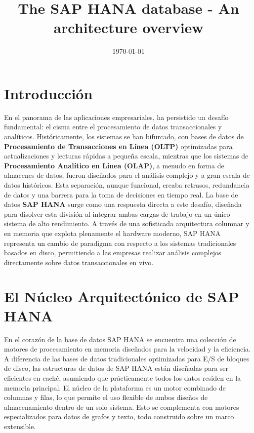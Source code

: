 \documentclass[12pt,a4paper]{article}
\title{The SAP HANA database - An architecture overview}
\date{\today}
\begin{document}
\maketitle

\section*{Introducción}

En el panorama de las aplicaciones empresariales, ha persistido un desafío fundamental: el cisma entre el procesamiento de datos transaccionales y analíticos. Históricamente, los sistemas se han bifurcado, con bases de datos de \textbf{Procesamiento de Transacciones en Línea (OLTP)} optimizadas para actualizaciones y lecturas rápidas a pequeña escala, mientras que los sistemas de \textbf{Procesamiento Analítico en Línea (OLAP)}, a menudo en forma de almacenes de datos, fueron diseñados para el análisis complejo y a gran escala de datos históricos. Esta separación, aunque funcional, creaba retrasos, redundancia de datos y una barrera para la toma de decisiones en tiempo real. La base de datos \textbf{SAP HANA} surge como una respuesta directa a este desafío, diseñada para disolver esta división al integrar ambas cargas de trabajo en un único sistema de alto rendimiento. A través de una sofisticada arquitectura columnar y en memoria que explota plenamente el hardware moderno, SAP HANA representa un cambio de paradigma con respecto a los sistemas tradicionales basados en disco, permitiendo a las empresas realizar análisis complejos directamente sobre datos transaccionales en vivo.

\section*{El Núcleo Arquitectónico de SAP HANA}

En el corazón de la base de datos SAP HANA se encuentra una colección de motores de procesamiento en memoria diseñados para la velocidad y la eficiencia. A diferencia de las bases de datos tradicionales optimizadas para E/S de bloques de disco, las estructuras de datos de SAP HANA están diseñadas para ser eficientes en caché, asumiendo que prácticamente todos los datos residen en la memoria principal. El núcleo de la plataforma es un motor combinado de columnas y filas, lo que permite el uso flexible de ambos diseños de almacenamiento dentro de un solo sistema. Esto se complementa con motores especializados para datos de grafos y texto, todo construido sobre un marco extensible.
\end{document}
